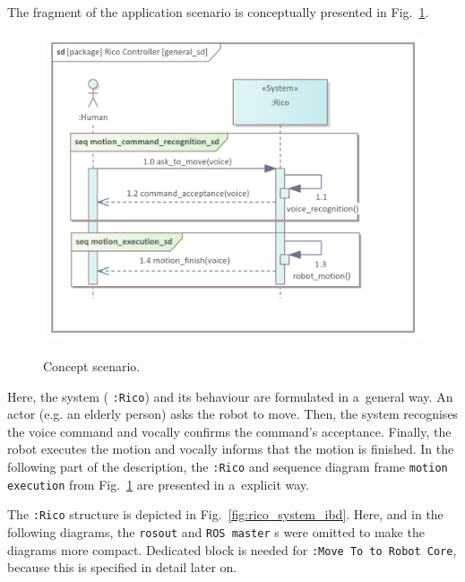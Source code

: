 \documentclass[11pt,oneside,a4paper]{report}
\begin{document}
	
	The fragment of the application scenario is conceptually presented in Fig.~\ref{fig:general_sd}.
	

	\begin{figure}[H] 
		\centering
		\begin{center}
			{\includegraphics[scale=.9]{img/rico_pkg/general_sd.png}}
		\end{center}
		\caption{Concept scenario.} 
		\label{fig:general_sd}
	\end{figure}
	
	Here, the system (\stSystem{} \texttt{:Rico}) and its behaviour are formulated in a~general way. An actor (e.g. an elderly person) asks the robot to move. Then, the system recognises the voice command and vocally confirms the command's acceptance. Finally, the robot executes the motion and vocally informs that the motion is finished.
	In the following part of the description, the \stSystem{} \texttt{:Rico} and sequence diagram frame \texttt{motion execution} from Fig.~\ref{fig:general_sd} are presented in a~explicit way.
	
		The \stSystem{} \texttt{:Rico} structure is depicted in Fig.~\ref{fig:rico_system_ibd}. Here, and in the following diagrams, the \texttt{rosout} and \texttt{ROS master} \stNode{}s were omitted to make the diagrams more compact. Dedicated block is needed for \stCommChannel{} \texttt{:Move To to Robot Core}, because this \stCommChannel{} is specified in detail later on.
	
\end{document}

